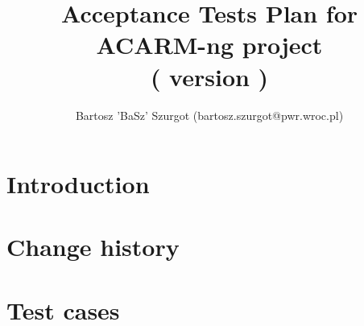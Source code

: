 \documentclass[a4paper,12pt]{article}
\title{Acceptance Tests Plan for ACARM-ng project\\( version \versionNumber{})}
\author{Bartosz 'BaSz' Szurgot (bartosz.szurgot@pwr.wroc.pl)}
\begin{document}
%
%
\maketitle

\tableofcontents

\section{Introduction}


\section{Change history}


\section{Test cases}

\end{document}
